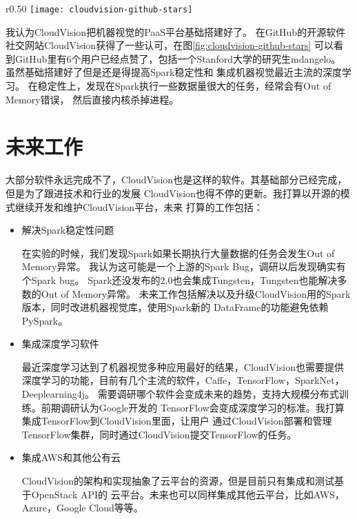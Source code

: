 \begin{wrapfigure}{r}{0.50\textwidth}
  \centering
    \texttt{[image: cloudvision-github-stars]}
    \caption{CloudVision在GitHub获得的认可}
  \label{fig:cloudvision-github-stars}
\end{wrapfigure}
我认为CloudVision把机器视觉的PaaS平台基础搭建好了。
在GitHub的开源软件社交网站CloudVision获得了一些认可，在图\ref{fig:cloudvision-github-stars}
可以看到GitHub里有6个用户已经点赞了，包括一个Stanford大学的研究生mdangelo。
虽然基础搭建好了但是还是得提高Spark稳定性和
集成机器视觉最近主流的深度学习。
在稳定性上，发现在Spark执行一些数据量很大的任务，经常会有Out of Memory错误，
然后直接内核杀掉进程。


\section{未来工作}
大部分软件永远完成不了，CloudVision也是这样的软件。其基础部分已经完成，但是为了跟进技术和行业的发展
CloudVision也得不停的更新。我打算以开源的模式继续开发和维护CloudVision平台，未来
打算的工作包括：
\begin{itemize}
  \item 解决Spark稳定性问题

        在实验的时候，我们发现Spark如果长期执行大量数据的任务会发生Out of Memory异常。
        我认为这可能是一个上游的Spark Bug，调研以后发现确实有个Spark bug。\cite{spark-oom-bug}
        Spark还没发布的2.0也会集成Tungsten，Tungsten也能解决多数的Out of Memory异常。
        未来工作包括解决以及升级CloudVision用的Spark版本，同时改进机器视觉库，使用Spark新的
        DataFrame的功能避免依赖PySpark。

  \item 集成深度学习软件

        最近深度学习达到了机器视觉多种应用最好的结果，CloudVision也需要提供
        深度学习的功能，目前有几个主流的软件，Caffe，TensorFlow，SparkNet，Deeplearning4j。
        需要调研哪个软件会变成未来的趋势，支持大规模分布式训练。前期调研认为Google开发的
        TensorFlow会变成深度学习的标准。我打算集成TensorFlow到CloudVision里面，让用户
        通过CloudVision部署和管理TensorFlow集群，同时通过CloudVision提交TensorFlow的任务。

  \item 集成AWS和其他公有云

        CloudVision的架构和实现抽象了云平台的资源，但是目前只有集成和测试基于OpenStack API的
        云平台。未来也可以同样集成其他云平台，比如AWS，Azure，Google Cloud等等。

\end{itemize}



